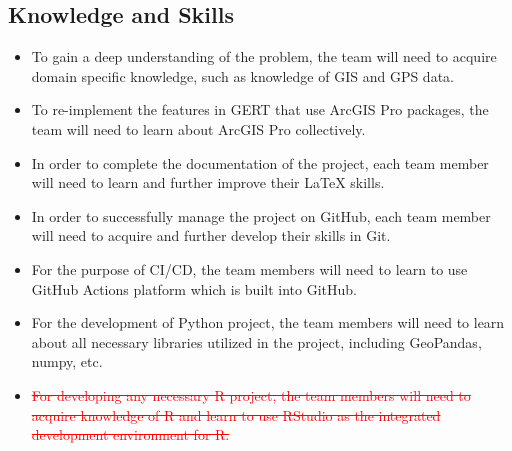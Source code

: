 \documentclass[12pt, titlepage]{article}
\begin{document}
\subsection*{Knowledge and Skills}
\begin{itemize}
    \item To gain a deep understanding of the problem, the team will need to acquire domain specific knowledge, such as knowledge of GIS and GPS data.
    \item To re-implement the features in GERT that use ArcGIS Pro packages, the team will need to learn about ArcGIS Pro collectively.
    \item In order to complete the documentation of the project, each team member will need to learn and further improve their LaTeX skills.
    \item In order to successfully manage the project on GitHub, each team member will need to acquire and further develop their skills in Git.
    \item For the purpose of CI/CD, the team members will need to learn to use GitHub Actions platform which is built into GitHub.
    \item For the development of Python project, the team members will need to learn about all necessary libraries utilized in the project,
    including GeoPandas, numpy, etc.
    \item \textcolor{red}{\sout{For developing any necessary R project, the team members will need to acquire knowledge of R and learn to use RStudio as the integrated development environment for R.}}
\end{itemize}
\end{document}
